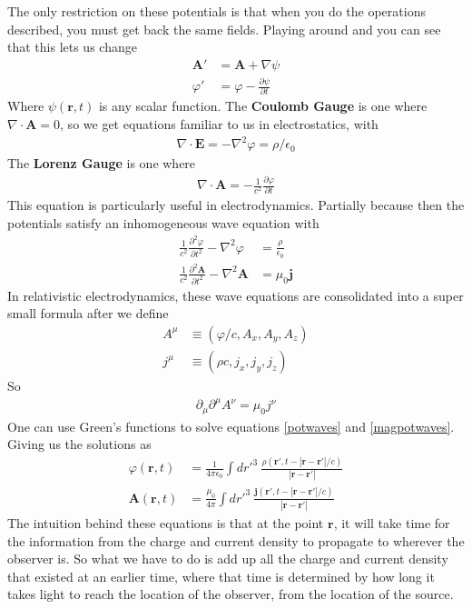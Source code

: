 The only restriction on these potentials is that when you do the operations described, you must get back the same fields. Playing around and you can see that this lets us change 
\begin{align}
    \textbf{A}' &= \textbf{A} +\nabla\psi\\
    \varphi' &=\varphi -\frac{\partial \psi}{\partial t}
\end{align}
Where $\psi(\textbf{r},t)$ is any scalar function. The \textbf{Coulomb Gauge} is one where $\nabla\cdot\textbf{A} = 0$, so we get equations familiar to us in electrostatics, with 
\begin{align}
    \nabla\cdot\textbf{E} = -\nabla^2\varphi = \rho/\epsilon_0
\end{align}
The \textbf{Lorenz Gauge} is one where
\begin{align}
    \boxed{\nabla\cdot\textbf{A} = -\frac{1}{c^2}\frac{\partial\varphi}{\partial t}}
\end{align}
This equation is particularly useful in electrodynamics. Partially because then the potentials satisfy an inhomogeneous wave equation with
\begin{align} \label{potwaves}
     \frac{1}{c^2}\frac{\partial^2\varphi}{\partial t^2}- \nabla^2\varphi &= \frac{\rho}{\epsilon_0}\\ \label{magpotwaves}
     \frac{1}{c^2}\frac{\partial^2\textbf{A}}{\partial t^2}- \nabla^2\textbf{A} &= \mu_0\textbf{j}
\end{align}
In relativistic electrodynamics, these wave equations are consolidated into a super small formula after we define
\begin{align}
A^\mu &\equiv (\varphi/c, A_x,A_y,A_z)\\
j^{\mu} &\equiv (\rho c, j_x, j_y, j_z)
\end{align}
So
\begin{align}
    \partial_\mu \partial^\mu A^\nu = \mu_0j^\nu
\end{align}
One can use Green's functions to solve equations \ref{potwaves} and \ref{magpotwaves}. Giving us the solutions as
\begin{align}
    \varphi(\textbf{r},t) &= \frac{1}{4\pi\epsilon_0}\int dr'^3 ~\frac{\rho(\textbf{r}', t - |\textbf{r}-\textbf{r}'|/c)}{|\textbf{r}-\textbf{r}'|}\\ \label{magpotretard}
    \textbf{A}(\textbf{r},t) &= \frac{\mu_0}{4\pi}\int dr'^3 ~\frac{\textbf{j}(\textbf{r}',t-|\textbf{r} - \textbf{r}'|/c)}{|\textbf{r}-\textbf{r}'|}
\end{align}
The intuition behind these equations is that at the point $\textbf{r}$, it will take time for the information from the charge and current density to propagate to wherever the observer is. So what we have to do is add up all the charge and current density that existed at an earlier time, where that time is determined by how long it takes light to reach the location of the observer, from the location of the source. 


